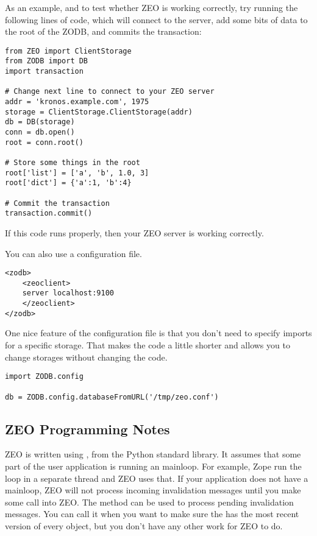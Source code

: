As an example, and to test whether ZEO is working correctly, try
running the following lines of code, which will connect to the server,
add some bits of data to the root of the ZODB, and commits the
transaction:

\begin{verbatim}
from ZEO import ClientStorage
from ZODB import DB
import transaction

# Change next line to connect to your ZEO server
addr = 'kronos.example.com', 1975
storage = ClientStorage.ClientStorage(addr)
db = DB(storage)
conn = db.open()
root = conn.root()

# Store some things in the root
root['list'] = ['a', 'b', 1.0, 3]
root['dict'] = {'a':1, 'b':4}

# Commit the transaction
transaction.commit()
\end{verbatim}

If this code runs properly, then your ZEO server is working correctly.

You can also use a configuration file.

\begin{verbatim}
<zodb>
    <zeoclient>
    server localhost:9100
    </zeoclient>
</zodb>
\end{verbatim}

One nice feature of the configuration file is that you don't need to
specify imports for a specific storage.  That makes the code a little
shorter and allows you to change storages without changing the code.

\begin{verbatim}
import ZODB.config

db = ZODB.config.databaseFromURL('/tmp/zeo.conf')
\end{verbatim}

\subsection{ZEO Programming Notes}

ZEO is written using , from the Python standard
library.  It assumes that some part of the user application is running
an  mainloop.  For example, Zope run the loop in a
separate thread and ZEO uses that.  If your application does not have
a mainloop, ZEO will not process incoming invalidation messages until
you make some call into ZEO.  The  method can
be used to process pending invalidation messages.  You can call it
when you want to make sure the  has the most recent
version of every object, but you don't have any other work for ZEO to do.

